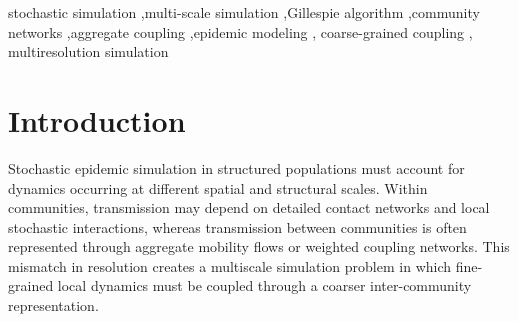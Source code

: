 \documentclass[a4paper,fleqn]{cas-sc}
\begin{document}
\begin{keywords}
stochastic simulation \sep multi-scale simulation \sep Gillespie algorithm \sep community networks \sep aggregate coupling \sep epidemic modeling \sep
coarse-grained coupling \sep
multiresolution simulation
\end{keywords}

\maketitle


\section{Introduction}
\label{sec:introduction}


Stochastic epidemic simulation in structured populations must account for dynamics occurring at different spatial and structural scales. Within communities, transmission may depend on detailed contact networks and local stochastic interactions, whereas transmission between communities is often represented through aggregate mobility flows or weighted coupling networks. This mismatch in resolution creates a multiscale simulation problem in which fine-grained local dynamics must be coupled through a coarser inter-community representation.


\end{document}
